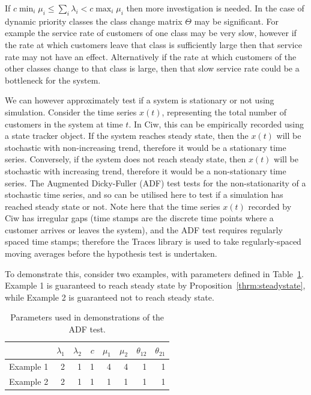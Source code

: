 \documentclass{article}
\begin{document}
If $c \min_i \mu_i \leq \sum_i \lambda_i < c \max_i \mu_i$ then more
investigation is needed. In the case of dynamic priority classes the class
change matrix $\Theta$ may be significant. For example the service rate of
customers of one class may be very slow, however if the rate at which customers
leave that class is sufficiently large then that service rate may not have an
effect. Alternatively if the rate at which customers of the other classes change
to that class is large, then that slow service rate could be a bottleneck for
the system.

We can however approximately test if a system is stationary or not using
simulation. Consider the time series $x(t)$, representing the total number of
customers in the system at time $t$. In Ciw, this can be empirically recorded
using a state tracker object. If the system reaches steady state, then the
$x(t)$ will be stochastic with non-increasing trend, therefore it would be a
stationary time series. Conversely, if the system does not reach steady state,
then $x(t)$ will be stochastic with increasing trend, therefore it would be a
non-stationary time series.
The Augmented Dicky-Fuller (ADF) test \cite{dickyfuller79} tests for the
non-stationarity of a stochastic time series, and so can be utilised here to
test if a simulation has reached steady state or not. Note here that the time
series $x(t)$ recorded by Ciw has irregular gaps (time stamps are the discrete
time points where a customer arrives or leaves the system), and the ADF test
requires regularly spaced time stamps; therefore the Traces library
\cite{traces} is used to take regularly-spaced moving averages before the
hypothesis test is undertaken.

To demonstrate this, consider two examples, with parameters defined in
Table~\ref{tbl:adf_example_parameters}. Example 1 is guaranteed to reach steady
state by Proposition~\ref{thrm:steadystate}, while Example 2 is guaranteed not
to reach steady state.

\begin{table}
\begin{center}
\begin{tabular}{rrrrrrrr}
\toprule
 & $\lambda_1$ & $\lambda_2$ & $c$ & $\mu_1$ & $\mu_2$ & $\theta_{12}$ & $\theta_{21}$ \\
\midrule
Example 1 & 2 & 1 & 1 & 4 & 4 & 1 & 1\\ 
Example 2 & 2 & 1 & 1 & 1 & 1 & 1 & 1\\ 
\bottomrule
\end{tabular}
\end{center}
\caption{Parameters used in demonstrations of the ADF test.}
\label{tbl:adf_example_parameters}
\end{table}
\end{document}

